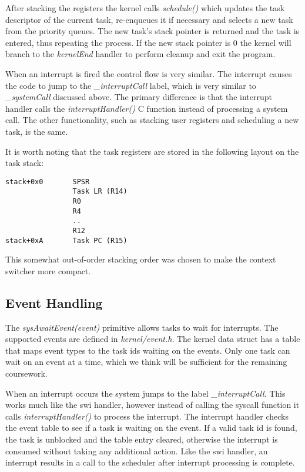 \documentclass[twoside,a4paper]{refart}
\begin{document}
After stacking the registers the kernel calls \textit{schedule()} which updates the task descriptor of the current task, re-enqueues it if necessary and selects a new task from the priority queues. The new task’s stack pointer is returned and the task is entered, thus repeating the process. If the new stack pointer is 0 the kernel will branch to the \textit{kernelEnd} handler to perform cleanup and exit the program.

When an interrupt is fired the control flow is very similar. The interrupt causes the code to jump to the \textit{\_interruptCall} label, which is very similar to \textit{\_systemCall} discussed above. The primary difference is that the interrupt handler calls the  \textit{interruptHandler()} C function instead of processing a system call. The other functionality, such as stacking user registers and scheduling a new task, is the same.

It is worth noting that the task registers are stored in the following layout on the task stack:

\begin{verbatim}
stack+0x0       SPSR
                Task LR (R14)
                R0
                R4
                ..
                R12
stack+0xA       Task PC (R15)
\end{verbatim}
This somewhat out-of-order stacking order was chosen to make the context switcher more compact.

\subsection{Event Handling}
The \textit{sysAwaitEvent(event)} primitive allows tasks to wait for interrupts. The supported events are defined in \textit{kernel/event.h}. The kernel data struct has a table that maps event types to the task ids waiting on the events. Only one task can wait on an event at a time, which we think will be sufficient for the remaining coursework.

When an interrupt occurs the system jumps to the label \textit{\_interruptCall}. This works much like the swi handler, however instead of calling the syscall function it calls \textit{interruptHandler()} to process the interrupt. The interrupt handler checks the event table to see if a task is waiting on the event. If a valid task id is found, the task is unblocked and the table entry cleared, otherwise the interrupt is consumed without taking any additional action. Like the swi handler, an interrupt results in a call to the scheduler after interrupt processing is complete.
\end{document}
